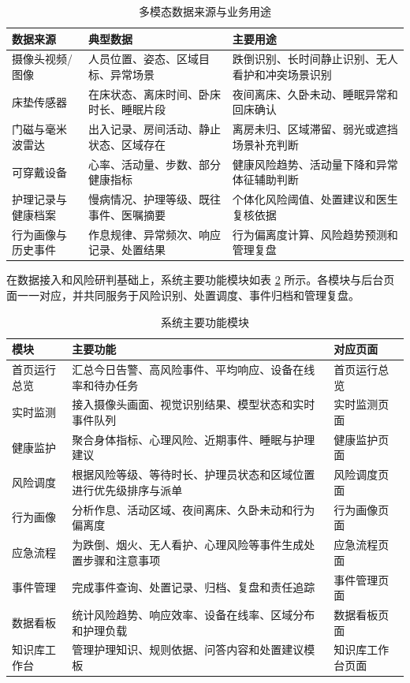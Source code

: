 \documentclass[UTF8,a4paper,zihao=-4,fontset=fandol]{ctexart}
\begin{document}
\begin{table}[htbp]
  \centering
  \caption{多模态数据来源与业务用途}
  \label{tab:data-sources}
  \begin{tabularx}{\textwidth}{>{\centering\arraybackslash}p{3.2cm}>{\centering\arraybackslash}p{4.2cm}>{\centering\arraybackslash}X}
    \toprule
    数据来源 & 典型数据 & 主要用途 \\
    \midrule
    摄像头视频/图像 & 人员位置、姿态、区域目标、异常场景 & 跌倒识别、长时间静止识别、无人看护和冲突场景识别 \\
    床垫传感器 & 在床状态、离床时间、卧床时长、睡眠片段 & 夜间离床、久卧未动、睡眠异常和回床确认 \\
    门磁与毫米波雷达 & 出入记录、房间活动、静止状态、区域存在 & 离房未归、区域滞留、弱光或遮挡场景补充判断 \\
    可穿戴设备 & 心率、活动量、步数、部分健康指标 & 健康风险趋势、活动量下降和异常体征辅助判断 \\
    护理记录与健康档案 & 慢病情况、护理等级、既往事件、医嘱摘要 & 个体化风险阈值、处置建议和医生复核依据 \\
    行为画像与历史事件 & 作息规律、异常频次、响应记录、处置结果 & 行为偏离度计算、风险趋势预测和管理复盘 \\
    \bottomrule
  \end{tabularx}
\end{table}

在数据接入和风险研判基础上，系统主要功能模块如表 \ref{tab:functions} 所示。各模块与后台页面一一对应，并共同服务于风险识别、处置调度、事件归档和管理复盘。

\begin{table}[htbp]
  \centering
  \caption{系统主要功能模块}
  \label{tab:functions}
  \begin{tabularx}{\textwidth}{>{\centering\arraybackslash}p{3cm}>{\centering\arraybackslash}X>{\centering\arraybackslash}p{3.2cm}}
    \toprule
    模块 & 主要功能 & 对应页面 \\
    \midrule
    首页运行总览 & 汇总今日告警、高风险事件、平均响应、设备在线率和待办任务 & 首页运行总览 \\
    实时监测 & 接入摄像头画面、视觉识别结果、模型状态和实时事件队列 & 实时监测页面 \\
    健康监护 & 聚合身体指标、心理风险、近期事件、睡眠与护理建议 & 健康监护页面 \\
    风险调度 & 根据风险等级、等待时长、护理员状态和区域位置进行优先级排序与派单 & 风险调度页面 \\
    行为画像 & 分析作息、活动区域、夜间离床、久卧未动和行为偏离度 & 行为画像页面 \\
    应急流程 & 为跌倒、烟火、无人看护、心理风险等事件生成处置步骤和注意事项 & 应急流程页面 \\
    事件管理 & 完成事件查询、处置记录、归档、复盘和责任追踪 & 事件管理页面 \\
    数据看板 & 统计风险趋势、响应效率、设备在线率、区域分布和护理负载 & 数据看板页面 \\
    知识库工作台 & 管理护理知识、规则依据、问答内容和处置建议模板 & 知识库工作台页面 \\
    \bottomrule
  \end{tabularx}
\end{table}
\end{document}
